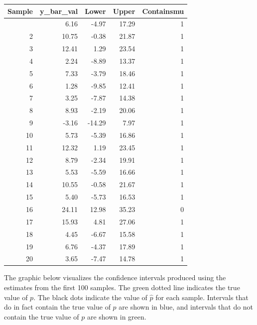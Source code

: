 \documentclass[
  letterpaper,
  DIV=11,
  numbers=noendperiod]{scrreprt}
\begin{document}
\begin{longtable}[]{@{}rrrrr@{}}
\toprule\noalign{}
Sample & y\_bar\_val & Lower & Upper & Containsmu \\
\midrule\noalign{}
\endhead
\bottomrule\noalign{}
\endlastfoot
1 & 6.16 & -4.97 & 17.29 & 1 \\
2 & 10.75 & -0.38 & 21.87 & 1 \\
3 & 12.41 & 1.29 & 23.54 & 1 \\
4 & 2.24 & -8.89 & 13.37 & 1 \\
5 & 7.33 & -3.79 & 18.46 & 1 \\
6 & 1.28 & -9.85 & 12.41 & 1 \\
7 & 3.25 & -7.87 & 14.38 & 1 \\
8 & 8.93 & -2.19 & 20.06 & 1 \\
9 & -3.16 & -14.29 & 7.97 & 1 \\
10 & 5.73 & -5.39 & 16.86 & 1 \\
11 & 12.32 & 1.19 & 23.45 & 1 \\
12 & 8.79 & -2.34 & 19.91 & 1 \\
13 & 5.53 & -5.59 & 16.66 & 1 \\
14 & 10.55 & -0.58 & 21.67 & 1 \\
15 & 5.40 & -5.73 & 16.53 & 1 \\
16 & 24.11 & 12.98 & 35.23 & 0 \\
17 & 15.93 & 4.81 & 27.06 & 1 \\
18 & 4.45 & -6.67 & 15.58 & 1 \\
19 & 6.76 & -4.37 & 17.89 & 1 \\
20 & 3.65 & -7.47 & 14.78 & 1 \\
\end{longtable}

The graphic below visualizes the confidence intervals produced using the
estimates from the first 100 samples. The green dotted line indicates
the true value of \(p\). The black dots indicate the value of
\(\hat{p}\) for each sample. Intervals that do in fact contain the true
value of \(p\) are shown in blue, and intervals that do not contain the
true value of \(p\) are shown in green.
\end{document}
